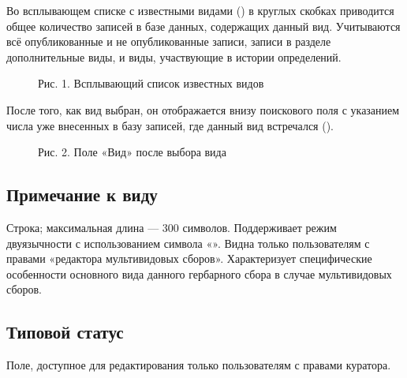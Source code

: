 \documentclass[letterpaper,10pt,russian]{sphinxmanual}
\begin{document}
Во всплывающем списке с известными видами ({\hyperref[\detokenize{main:main-pic1}]{}})
в круглых скобках приводится общее количество записей в базе данных, содержащих
данный вид. Учитываются всё \textendash{} опубликованные и не опубликованные записи,
записи в разделе дополнительные виды, и виды, участвующие в истории определений.

\begin{figure}[htbp]
\centering
\capstart

\noindent{}
\caption{Рис. 1. Всплывающий список известных видов}\label{\detokenize{main:main-pic1}}\label{\detokenize{main:id64}}\end{figure}

После того, как вид выбран, он отображается внизу поискового поля с указанием
числа уже внесенных в базу записей, где данный вид встречался ({\hyperref[\detokenize{main:main-pic2}]{}}).

\begin{figure}[htbp]
\centering
\capstart

\noindent{}
\caption{Рис. 2. Поле «Вид» после выбора вида}\label{\detokenize{main:main-pic2}}\label{\detokenize{main:id65}}\end{figure}

\ignorespaces 

\subsection{Примечание к виду}
\label{\detokenize{main:id16}}\label{\detokenize{main:index-11}}
Строка; максимальная длина — 300 символов. Поддерживает режим двуязычности с использованием символа «\textbar{}».
Видна только пользователям с правами «редактора мультивидовых сборов».
Характеризует специфические особенности основного вида данного гербарного сбора в случае мультивидовых сборов.

\ignorespaces 

\subsection{Типовой статус}
\label{\detokenize{main:id17}}\label{\detokenize{main:index-12}}
Поле, доступное для редактирования только пользователям с правами куратора.
\end{document}
